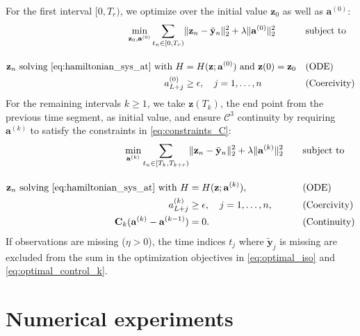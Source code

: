 \documentclass[11pt, a4paper]{article}
\theoremstyle{plain}
\theoremstyle{definition}
\theoremstyle{remark}
\begin{document}
For the first interval $[0,T_{r})$, we optimize over the initial value $\mathbf{z}_0$ \cite{chenSymplecticRecurrentNeural2019} as well as $\mathbf{a}^{(0)}$:
\begin{equation}
    \begin{aligned}
    \min_{\mathbf{z}_0,\mathbf{a}^{(0)}}  \sum_{t_n \in [0,T_{r})} &\| \mathbf{z}_n - \tilde{\mathbf{y}}_n \|_2^2 + \lambda \| \mathbf{a}^{(0)} \|_2^2
   \quad & & \text{subject to}\\[1em]
     \mathbf{z}_n  \text{ solving }  \eqref{eq:hamiltonian_sys_at} \text{ with } H&=H(\mathbf{z};\mathbf{a}^{(0)}) \text{ and } \mathbf{z}(0) = \mathbf{z}_0 & & \text{(ODE)}\\ 
    a_{L+j}^{(0)}&\ge \epsilon, \quad j=1,\dots,n & & \text{(Coercivity)}
\end{aligned}
\label{eq:optimal_iso}
\end{equation}
For the remaining intervals $k\geq1$, we take $\mathbf{z}(T_{k})$, the end point from the previous time segment, as initial value, and ensure $\mathcal C^3$ continuity by requiring $\mathbf{a}^{(k)}$ to satisfy the constraints in \eqref{eq:constraints_C}:
\begin{equation}
    \begin{aligned}
    \min_{\mathbf{a}^{(k)}}  \sum_{t_n \in [T_{k},T_{k+r})}& \| \mathbf{z}_n - \tilde{\mathbf{y}}_n \|_2^2 + \lambda \| \mathbf{a}^{(k)} \|_2^2
   \quad & & \text{subject to}\\[1em]
     \mathbf{z}_n  \text{ solving }  \eqref{eq:hamiltonian_sys_at} \text{ with }  H&=H(\mathbf{z};\mathbf{a}^{(k)}), & & \text{(ODE)}\\ 
    a_{L+j}^{(k)}&\ge \epsilon, \quad j=1,\dots,n, & & \text{(Coercivity)} \\
     \mathbf{C}_k (\mathbf{a}^{(k)} - \mathbf{a}^{(k-1)}) &= 0.  & & \text{(Continuity)}
\end{aligned}
\label{eq:optimal_control_k}
\end{equation}
If observations are missing ($\eta >0$), the time indices $t_j$ where $\tilde{\mathbf{y}}_j$ is missing are excluded from the sum in the optimization objectives in \eqref{eq:optimal_iso} and \eqref{eq:optimal_control_k}.






\section{Numerical experiments}
\end{document}
